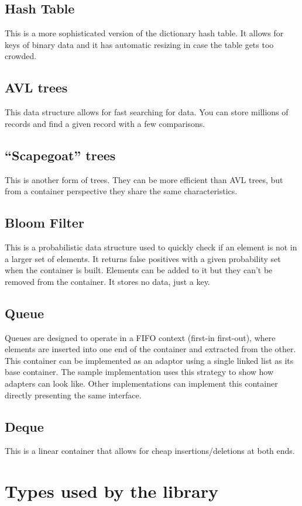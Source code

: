\documentclass[12pt,a4paper]{memoir} %
\begin{document}
\subsection{Hash Table}
This is a more sophisticated version of the dictionary hash table. It allows for keys of binary data and it has automatic resizing in case the table gets too crowded.
\subsection{AVL trees}
This data structure allows for fast searching for data. You can store millions of records and find a given record with a few comparisons.
\subsection{“Scapegoat” trees}
This is another form of trees. They can be more efficient than AVL trees, but from a container perspective they share the same characteristics.
\subsection{Bloom Filter}
This is a probabilistic data structure used to quickly check if an element is not in a larger set of elements. It returns false positives with a given probability set when the container is built. Elements can be added to it but they can't be removed from the container. It stores no data, just a key.
\subsection{Queue}
Queues are designed to operate in a FIFO context (first-in first-out), where elements are inserted into one end of the container and extracted from the other. This container can be implemented as an adaptor using a single linked list as its base container. The sample implementation uses this strategy to show how adapters can look like. Other implementations can implement this container directly presenting the same interface.
\subsection{Deque}
This is a linear container that allows for cheap insertions/deletions at both ends.

\section{Types used by the library}
\end{document}
